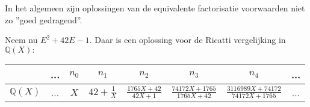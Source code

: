 \documentclass[a4paper,12pt]{article}
\begin{document}
\begin{remark}
    In het algemeen zijn oplossingen van de equivalente factorisatie voorwaarden niet zo ''goed gedragend''.
\end{remark}

\begin{example}
    Neem nu $E^2 + 42 E - 1$. Daar is een oplossing voor de Ricatti vergelijking in $\mathbb{Q}(X):$
    \begin{table}[ht]
        \centering
        \begin{tabular}{|c||c|c|c|c|c|c|c|} \hline
                            & ... & $n_{0}$ & $n_{1}$            & $n_{2}$                        & $n_{3}$                              & $n_{4}$                                   & ... \\ \hline \hline
            $\mathbb{Q}(X)$ & ... & $X$     & $42 + \frac{1}{X}$ & $\frac{1765 X + 42}{42 X + 1}$ & $\frac{74172 X + 1765}{1765 X + 42}$ & $\frac{3116989 X + 74172}{74172 X + 1765}
            $               & ...                                                                                                                                                          \\ \hline
        \end{tabular}
    \end{table}
\end{example}







\end{document}
